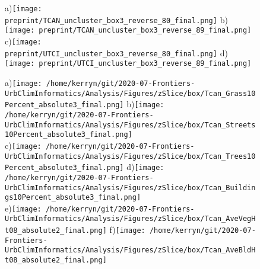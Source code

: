\documentclass{article}
\begin{document}
\begin{figure}   %
\centering 
{\tiny a)}\texttt{[image: preprint/TCAN\_uncluster\_box3\_reverse\_80\_final.png]}   
{\tiny b)}\texttt{[image: preprint/TCAN\_uncluster\_box3\_reverse\_89\_final.png]}
\\
{\tiny c)}\texttt{[image: preprint/UTCI\_uncluster\_box3\_reverse\_80\_final.png]}   
{\tiny d)}\texttt{[image: preprint/UTCI\_uncluster\_box3\_reverse\_89\_final.png]}
\end{figure} 
\clearpage















\begin{figure}           %
\centering    
{\tiny a)}\texttt{[image: /home/kerryn/git/2020-07-Frontiers-UrbClimInformatics/Analysis/Figures/zSlice/box/Tcan\_Grass10Percent\_absolute3\_final.png]}
{\tiny b)}\texttt{[image: /home/kerryn/git/2020-07-Frontiers-UrbClimInformatics/Analysis/Figures/zSlice/box/Tcan\_Streets10Percent\_absolute3\_final.png]}\\
{\tiny c)}\texttt{[image: /home/kerryn/git/2020-07-Frontiers-UrbClimInformatics/Analysis/Figures/zSlice/box/Tcan\_Trees10Percent\_absolute3\_final.png]}
{\tiny d)}\texttt{[image: /home/kerryn/git/2020-07-Frontiers-UrbClimInformatics/Analysis/Figures/zSlice/box/Tcan\_Buildings10Percent\_absolute3\_final.png]}\\
{\tiny e)}\texttt{[image: /home/kerryn/git/2020-07-Frontiers-UrbClimInformatics/Analysis/Figures/zSlice/box/Tcan\_AveVegHt08\_absolute2\_final.png]}
{\tiny f)}\texttt{[image: /home/kerryn/git/2020-07-Frontiers-UrbClimInformatics/Analysis/Figures/zSlice/box/Tcan\_AveBldHt08\_absolute2\_final.png]}
\end{figure} 
\clearpage
\end{document}
